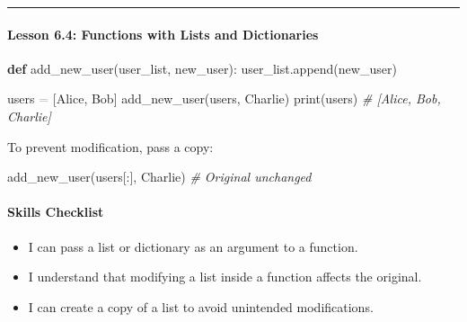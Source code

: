 \documentclass[
  justified,
  openright,
]{tufte-book}
\let\subsection\paragraph
\let\paragraph\paragraph
\newcommand{\KeywordTok}[1]{\textcolor{CodeKeyword}{\textbf{#1}}}  %
\newcommand{\StringTok}[1]{\textcolor{CodeString}{#1}}              %
\newcommand{\CommentTok}[1]{\textcolor{CodeComment}{\textit{#1}}}  %
\newcommand{\OperatorTok}[1]{\textcolor{DarkGray}{#1}}              %
\newenvironment{Shaded}{%
  \begin{mdframed}[style=TufteCode]%
}{%
  \end{mdframed}%
}
\let\subsection\paragraph
\let\paragraph\paragraph
\providecommand{\tightlist}{%
  \setlength{\itemsep}{0pt}\setlength{\parskip}{0pt}}
\begin{document}
\begin{center}\rule{0.5\linewidth}{0.5pt}\end{center}

\subsection{Lesson 6.4: Functions with Lists and
Dictionaries}\label{lesson-6.4-functions-with-lists-and-dictionaries}



\begin{Shaded}
\begin{Highlighting}[]
\KeywordTok{def} add\_new\_user(user\_list, new\_user):
    user\_list.append(new\_user)
 
users \OperatorTok{=} [\StringTok{\textquotesingle{}Alice\textquotesingle{}}, \StringTok{\textquotesingle{}Bob\textquotesingle{}}]
add\_new\_user(users, \StringTok{\textquotesingle{}Charlie\textquotesingle{}})
print(users)   \CommentTok{\# [\textquotesingle{}Alice\textquotesingle{}, \textquotesingle{}Bob\textquotesingle{}, \textquotesingle{}Charlie\textquotesingle{}]}
\end{Highlighting}
\end{Shaded}

To prevent modification, pass a copy:

\begin{Shaded}
\begin{Highlighting}[]
add\_new\_user(users[:], \StringTok{\textquotesingle{}Charlie\textquotesingle{}})   \CommentTok{\# Original unchanged}
\end{Highlighting}
\end{Shaded}

\subsection{Skills Checklist}\label{skills-checklist-30}

\begin{itemize}
\tightlist
\item[$\square$]
  I can pass a list or dictionary as an argument to a function.
\item[$\square$]
  I understand that modifying a list inside a function affects the
  original.
\item[$\square$]
  I can create a copy of a list to avoid unintended modifications.
\end{itemize}
\end{document}
